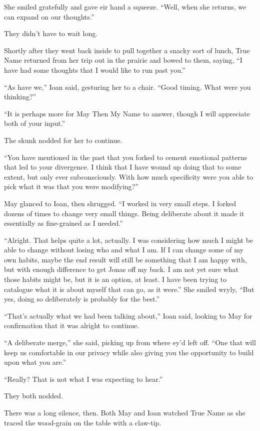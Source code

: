 She smiled gratefully and gave eir hand a squeeze. ``Well, when she returns, we can expand on our thoughts.''

They didn't have to wait long.

Shortly after they went back inside to pull together a snacky sort of lunch, True Name returned from her trip out in the prairie and bowed to them, saying, ``I have had some thoughts that I would like to run past you.''

``As have we,'' Ioan said, gesturing her to a chair. ``Good timing. What were you thinking?''

``It is perhaps more for May Then My Name to answer, though I will appreciate both of your input.''

The skunk nodded for her to continue.

``You have mentioned in the past that you forked to cement emotional patterns that led to your divergence. I think that I have wound up doing that to some extent, but only ever subconsciously. With how much specificity were you able to pick what it was that you were modifying?''

May glanced to Ioan, then shrugged. ``I worked in very small steps. I forked dozens of times to change very small things. Being deliberate about it made it essentially as fine-grained as I needed.''

``Alright. That helps quite a lot, actually. I was considering how much I might be able to change without losing who and what I am. If I can change some of my own habits, maybe the end result will still be something that I am happy with, but with enough difference to get Jonas off my back. I am not yet sure what those habits might be, but it is an option, at least. I have been trying to catalogue what it is about myself that can go, as it were.'' She smiled wryly, ``But yes, doing so deliberately is probably for the best.''

``That's actually what we had been talking about,'' Ioan said, looking to May for confirmation that it was alright to continue.

``A deliberate merge,'' she said, picking up from where ey'd left off. ``One that will keep us comfortable in our privacy while also giving you the opportunity to build upon what you are.''

``Really? That is not what I was expecting to hear.''

They both nodded.

There was a long silence, then. Both May and Ioan watched True Name as she traced the wood-grain on the table with a claw-tip.


